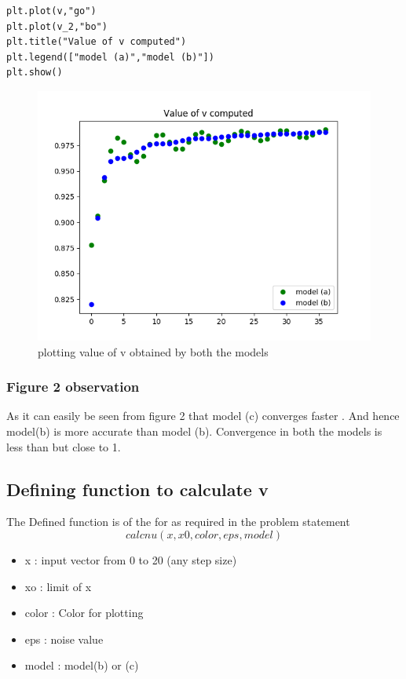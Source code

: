 \documentclass[a4paper]{article}
\begin{document}
\begin{lstlisting}
plt.plot(v,"go")
plt.plot(v_2,"bo")
plt.title("Value of v computed")
plt.legend(["model (a)","model (b)"])
plt.show()

\end{lstlisting}
\begin{figure}
\includegraphics[width=\columnwidth]{Figure_1-1.png}
\caption{plotting value of v obtained by both the models}
\end{figure}
\subsubsection{Figure 2 observation}
As it can easily be seen from figure 2 that model (c) converges faster . And hence model(b) is more accurate than model (b). Convergence in both the models is less than but close to 1.
\subsection{Defining function to calculate v}
The Defined function is of the for as required in the problem statement
$$calcnu(x,x0,color,eps,model)$$
\begin{itemize}
\item x : input vector from 0 to 20 (any step size)
\item xo : limit of x
\item color : Color for plotting
\item eps : noise value
\item model : model(b) or (c)
\end{itemize}
\end{document}

